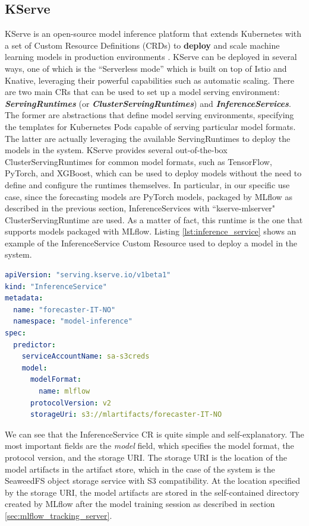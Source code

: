 \subsection{KServe}
\label{sec:kserve}

KServe is an open-source model inference platform that extends Kubernetes with a set of Custom Resource Definitions (CRDs) to \textbf{deploy} and scale machine learning models in production environments \cite{kserve}.
KServe can be deployed in several ways, one of which is the ``Serverless mode'' which is built on top of Istio and Knative, leveraging their powerful capabilities such as automatic scaling. 
There are two main CRs that can be used to set up a model serving environment: \textit{\textbf{ServingRuntimes}} (or \textit{\textbf{ClusterServingRuntimes}}) and \textit{\textbf{InferenceServices}}.
The former are abstractions that define model serving environments, specifying the templates for Kubernetes Pods capable of serving particular model formats. 
The latter are actually leveraging the available ServingRuntimes to deploy the models in the system.  
KServe provides several out-of-the-box ClusterServingRuntimes for common model formats, such as TensorFlow, PyTorch, and XGBoost, which can be used to deploy models without the need to define and configure the runtimes themselves.
In particular, in our specific use case, since the forecasting models are PyTorch models, packaged by MLflow as described in the previous section, InferenceServices with ``kserve-mlserver" ClusterServingRuntime are used. 
As a matter of fact, this runtime is the one that supports models packaged with MLflow.
Listing \ref{lst:inference_service} shows an example of the InferenceService Custom Resource used to deploy a model in the system. \\

\begin{lstlisting}[language=yaml, caption={InferenceService Custom Resource example}, label={lst:inference_service}]
apiVersion: "serving.kserve.io/v1beta1"
kind: "InferenceService"
metadata:
  name: "forecaster-IT-NO"
  namespace: "model-inference"
spec:
  predictor:
    serviceAccountName: sa-s3creds
    model:
      modelFormat:
        name: mlflow
      protocolVersion: v2  
      storageUri: s3://mlartifacts/forecaster-IT-NO
\end{lstlisting}


We can see that the InferenceService CR is quite simple and self-explanatory. 
The most important fields are the \textit{model} field, which specifies the model format, the protocol version, and the storage URI.
The storage URI is the location of the model artifacts in the artifact store, which in the case of the system is the SeaweedFS object storage service with S3 compatibility. 
At the location specified by the storage URI, the model artifacts are stored in the self-contained directory created by MLflow after the model training session as described in section \ref{sec:mlflow_tracking_server}.

